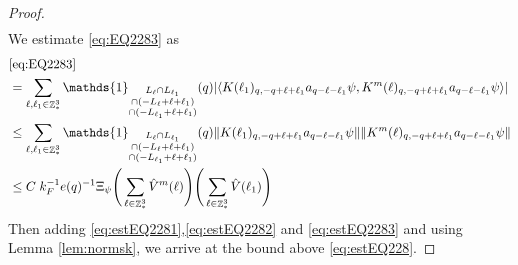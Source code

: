 \documentclass[sn-mathphys, Numbered ,a4paper]{sn-jnl}%
\DeclareMathOperator{\Z}{\mathbb{Z}}
\newcommand{\eva}[1]{\left\langle #1 \right\rangle}
\theoremstyle{plain}
\theoremstyle{definition}
\theoremstyle{remark}
\theoremstyle{plain}
\theoremstyle{definition}
\theoremstyle{remark}
\begin{document}
{\begin{proof}
\begin{align}
		\end{align}
		We estimate \eqref{eq:EQ2283} as
		\begin{align}
			& \eqref{eq:EQ2283}\nonumber\\
			&= \sum\limits_{\ell, \ell_1\in \Z^3_*} \mathds{1}_{\substack{L_{\ell}\cap L_{\ell_1}\\ \cap (-L_{\ell}+\ell+\ell_1) \\ \cap (-L_{\ell_1}+\ell+\ell_1)}} (q) \abs{\eva{K(\ell_1)_{q,-q+\ell+\ell_1} a_{q-\ell-\ell_1} \psi, K^m(\ell)_{q,-q+\ell+\ell_1} a_{q-\ell-\ell_1}\psi }}\nonumber\\
			&\leq \sum\limits_{\ell, \ell_1\in \Z^3_*} \mathds{1}_{\substack{L_{\ell}\cap L_{\ell_1}\\\cap (-L_{\ell}+\ell+\ell_1) \\ \cap (-L_{\ell_1}+\ell+\ell_1)}} (q) \norm{K(\ell_1)_{q,-q+\ell+\ell_1} a_{q-\ell-\ell_1} \psi}\norm{ K^m(\ell)_{q,-q+\ell+\ell_1} a_{q-\ell-\ell_1}\psi }\nonumber\\
			&\leq C\; k_F^{-1}e(q)^{-1} \Xi_{\psi} \Bigg(\sum\limits_{\ell \in \Z^3_*} \hat{V}^{m}(\ell) \Bigg)\Bigg(\sum\limits_{\ell \in \Z^3_*} \hat{V}(\ell_1)\Bigg)  \label{eq:estEQ2283}
		\end{align} 
		Then adding \eqref{eq:estEQ2281},\eqref{eq:estEQ2282} and \eqref{eq:estEQ2283} and using Lemma \ref{lem:normsk}, we arrive at the bound above \eqref{eq:estEQ228}.  
\end{proof}}
\end{document}
